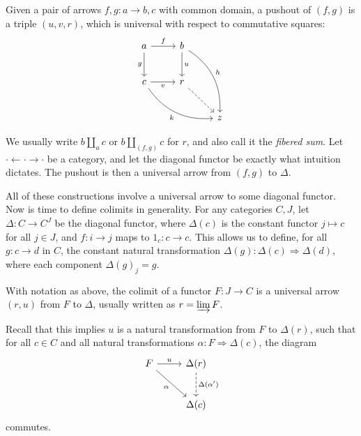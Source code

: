 Given a pair of arrows $f,g : a \to b,c$ with common domain, a pushout of $(f,g)$ is a triple $(u,v,r)$, which is universal with respect to commutative squares:
\[\begin{tikzcd}[row sep = 2.5em, column sep = 2.5em]
a\ar[" f ", r] \ar[" g "', d]  & b \ar[" u ", d] \ar[" h ", bend left, ddr]  &  \\
c\ar[" v "', r] \ar[" k "', bend right, drr]  & r \ar[dashed, dr]  &  \\
 &  & z
\end{tikzcd}\]

We usually write $b\amalg_a c$ or $b\amalg_{(f,g)} c$ for $r$, and also call it the \emph{fibered sum}. Let $\cdot \leftarrow \cdot \to \cdot $ be a category, and let the diagonal functor be exactly what intuition dictates. The pushout is then a universal arrow from $(f,g)$ to $\Delta $.

All of these constructions involve a universal arrow to some diagonal functor. Now is time to define colimits in generality. For any categories $C,J$, let $\Delta : C \to C^J$ be the diagonal functor, where $\Delta (c)$ is the constant functor $j\mapsto c$ for all $j\in J$, and $f : i \to j$ maps to $1_c : c \to c$. This allows us to define, for all $g : c \to d$ in $C$, the constant natural transformation $\Delta (g): \Delta (c) \Rightarrow \Delta (d)$, where each component $\Delta (g)_j=g$.

\begin{definition}[Colimit]\label{dfn:3.4}
	With notation as above, the colimit of a functor $F : J \to C$ is a universal arrow $(r,u)$ from $F$ to $\Delta $, usually written as $r=\varinjlim F$.
\end{definition}

Recall that this implies $u$ is a natural transformation from $F$ to $\Delta (r)$, such that for all $c\in C$ and all natural transformations $\alpha : F \Rightarrow \Delta (c)$, the diagram
\[\begin{tikzcd}[row sep = 2.5em, column sep = 2.5em]
F\ar[" u ", r] \ar[" \alpha  "', dr]  & \Delta (r)\ar[" \Delta (\alpha ' )", dashed, d]  \\
 & \Delta (c)
\end{tikzcd}\]
commutes.

